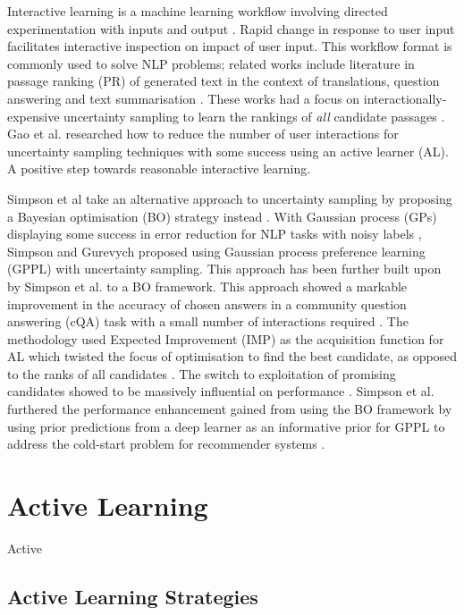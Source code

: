 \documentclass[ %
                    author={James Stephenson},
                supervisor={Dr. Edwin Simpson},
                    degree={MSc},
                     title={Project Plan: Bayesian Deep Learning For Extractive Test Summarisation},
                  subtitle={},
                      type={},
                      year={2022}]{../additions/dissertation}
\begin{document}
		Interactive learning is a machine learning workflow involving directed experimentation with inputs and output \cite{Amershi14}. Rapid change in response to user input facilitates interactive inspection on impact of user input.  This workflow format is commonly used to solve NLP problems; related works include literature in passage ranking (PR) of generated text in the context of translations, question answering and text summarisation \cite{Peris18, Lin17, PVS17}. These works had a focus on interactionally-expensive uncertainty sampling to learn the rankings of \emph{all} candidate passages \cite{Simpson19}. Gao et al. \cite{Gao18} researched how to reduce the number of user interactions for uncertainty sampling techniques with some success using an active learner (AL). A positive step towards reasonable interactive learning.

	\medbreak
	Simpson et al \cite{Simpson19} take an alternative approach to uncertainty sampling by proposing a Bayesian optimisation (BO) strategy instead \cite{Simpson19}. With Gaussian process (GPs) displaying some success in error reduction for NLP tasks with noisy labels \cite{Cohn13, Beck14}, Simpson and Gurevych \cite{Simpson18} proposed using Gaussian process preference learning (GPPL) with uncertainty sampling. This approach has been further built upon by Simpson et al. \cite{Simpson19} to a BO framework. This approach showed a markable improvement in the accuracy of chosen answers in a community question answering (cQA) task with a small number of interactions required \cite{Simpson19}. The methodology used Expected Improvement (IMP) as the acquisition function for AL which twisted the focus of optimisation to find the best candidate, as opposed to the ranks of all candidates \cite{Simpson19}. The switch to exploitation of promising candidates showed to be massively influential on performance \cite{Simpson19}. Simpson et al. \cite{Simpson19} furthered the performance enhancement gained from using the BO framework by using prior predictions from a deep learner as an informative prior for GPPL \cite{Simpson19} to address the cold-start problem for recommender systems \cite{Bobadilla12}.

		
		\section{Active Learning}
		\label{chap:literaturereview:active}
		
		Active
		
			\subsection{Active Learning Strategies}
			\label{chap:literaturereview:active:strategies}
			
\end{document}
